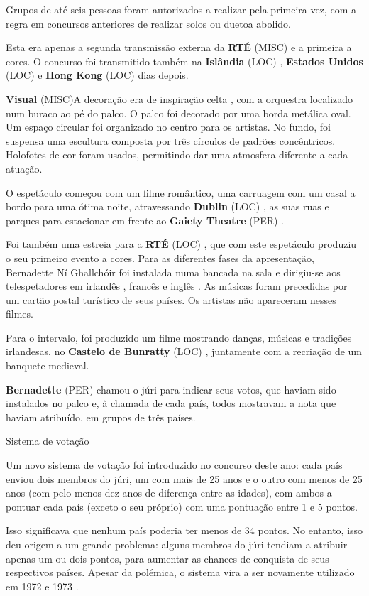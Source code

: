 \documentclass[12pt,a4paper]{article}
\begin{document}
Grupos de até seis pessoas foram autorizados a realizar pela primeira vez, com a regra em concursos anteriores de realizar solos ou duetoa abolido.

Esta era apenas a segunda transmissão externa da \textbf{RTÉ} (MISC) e a primeira a cores. O concurso foi transmitido também na \textbf{Islândia} (LOC) , \textbf{Estados Unidos} (LOC) e \textbf{Hong Kong} (LOC) dias depois.



\textbf{Visual} (MISC)A decoração era de inspiração celta , com a orquestra localizado num buraco ao pé do palco. O palco foi decorado por uma borda metálica oval. Um espaço circular foi organizado no centro para os artistas. No fundo, foi suspensa uma escultura composta por três círculos de padrões concêntricos. Holofotes de cor foram usados, permitindo dar uma atmosfera diferente a cada atuação.

O espetáculo começou com um filme romântico, uma carruagem com um casal a bordo para uma ótima noite, atravessando \textbf{Dublin} (LOC) , as suas ruas e parques para estacionar em frente ao \textbf{Gaiety Theatre} (PER) .

Foi também uma estreia para a \textbf{RTÉ} (LOC) , que com este espetáculo produziu o seu primeiro evento a cores. Para as diferentes fases da apresentação, Bernadette Ní Ghallchóir foi instalada numa bancada na sala e dirigiu-se aos telespetadores em irlandês , francês e inglês . As músicas foram precedidas por um cartão postal turístico de seus países. Os artistas não apareceram nesses filmes.

Para o intervalo, foi produzido um filme mostrando danças, músicas e tradições irlandesas, no \textbf{Castelo de Bunratty} (LOC) , juntamente com a recriação de um banquete medieval.

\textbf{Bernadette} (PER) chamou o júri para indicar seus votos, que haviam sido instalados no palco e, à chamada de cada país, todos mostravam a nota que haviam atribuído, em grupos de três países.



Sistema de votação

Um novo sistema de votação foi introduzido no concurso deste ano: cada país enviou dois membros do júri, um com mais de 25 anos e o outro com menos de 25 anos (com pelo menos dez anos de diferença entre as idades), com ambos a pontuar cada país (exceto o seu próprio) com uma pontuação entre 1 e 5 pontos.

Isso significava que nenhum país poderia ter menos de 34 pontos. No entanto, isso deu origem a um grande problema: alguns membros do júri tendiam a atribuir apenas um ou dois pontos, para aumentar as chances de conquista de seus respectivos países. Apesar da polémica, o sistema vira a ser novamente utilizado em 1972 e 1973 .
\end{document}
